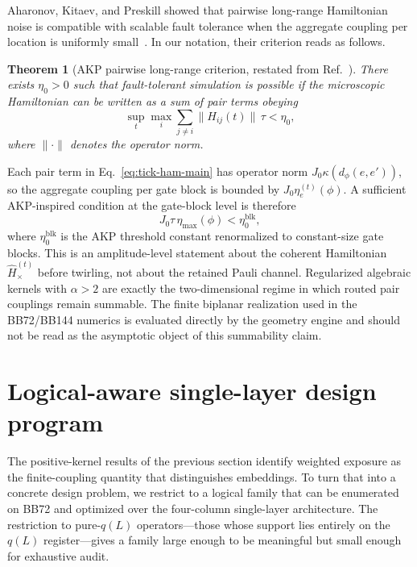 \documentclass[
aps,
prx,
10pt,
twocolumn,
groupedaddress,
longbibliography,
nofootinbib,
floatfix
]{revtex4-2}
\newtheorem{theorem}{Theorem}
\theoremstyle{definition}
\newcommand{\Hxt}{\hat H_{\times}^{(t)}}
\begin{document}
Aharonov, Kitaev, and Preskill showed that pairwise long-range Hamiltonian noise is compatible with scalable fault tolerance when the aggregate coupling per location is uniformly small~\cite{akp_2006}. In our notation, their criterion reads as follows.

\begin{theorem}[AKP pairwise long-range criterion, restated from Ref.~]
There exists $\eta_0>0$ such that fault-tolerant simulation is possible if the microscopic Hamiltonian can be written as a sum of pair terms obeying
\begin{equation}
\sup_t\max_i\sum_{j\neq i}\lVert H_{ij}(t)\rVert\,\tau<\eta_0,
\end{equation}
where $\lVert\cdot\rVert$ denotes the operator norm.
\end{theorem}

Each pair term in Eq.~\eqref{eq:tick-ham-main} has operator norm $J_0\kappa(d_\phi(e,e'))$, so the aggregate coupling per gate block is bounded by $J_0\eta_e^{(t)}(\phi)$. A sufficient AKP-inspired condition at the gate-block level is therefore
\begin{equation}
J_0\tau\,\eta_{\max}(\phi)<\eta_0^{\mathrm{blk}},
\end{equation}
where $\eta_0^{\mathrm{blk}}$ is the AKP threshold constant renormalized to constant-size gate blocks. This is an amplitude-level statement about the coherent Hamiltonian $\Hxt$ before twirling, not about the retained Pauli channel. Regularized algebraic kernels with $\alpha>2$ are exactly the two-dimensional regime in which routed pair couplings remain summable. The finite biplanar realization used in the BB72/BB144 numerics is evaluated directly by the geometry engine and should not be read as the asymptotic object of this summability claim.

\section{Logical-aware single-layer design program}
\label{sec:logical-aware}

The positive-kernel results of the previous section identify weighted exposure as the finite-coupling quantity that distinguishes embeddings. To turn that into a concrete design problem, we restrict to a logical family that can be enumerated on BB72 and optimized over the four-column single-layer architecture. The restriction to pure-$q(L)$ operators---those whose support lies entirely on the $q(L)$ register---gives a family large enough to be meaningful but small enough for exhaustive audit.
\end{document}
